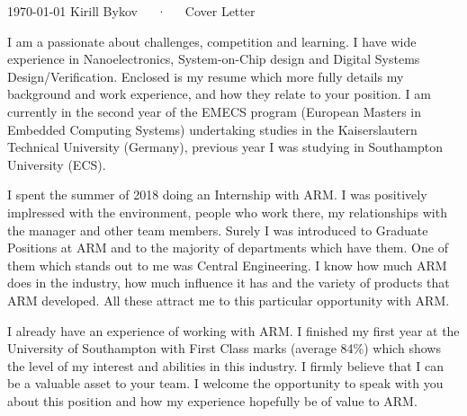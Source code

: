 \documentclass[11pt, a4paper]{awesome-cv}
\begin{document}
\makecvheader[R]

\makecvfooter
  {\today}
  {Kirill Bykov~~~·~~~Cover Letter}
  {}

\makelettertitle

\begin{cvletter}

I am a passionate about challenges, competition and learning. I have wide experience in Nanoelectronics, System-on-Chip design and Digital Systems Design/Verification. Enclosed is my resume which more fully details my background and work experience, and how they relate to your position. I am currently in the second year of the EMECS program (European Masters in Embedded Computing Systems) undertaking studies in the Kaiserslautern Technical University (Germany), previous year I was studying in Southampton University (ECS).

I spent the summer of 2018 doing an Internship with ARM. I was positively implressed with the environment, people who work there, my relationships with the manager and other team members. Surely I was introduced to Graduate Positions at ARM and to the majority of departments which have them. One of them which stands out to me was Central Engineering. I know how much ARM does in the industry, how much influence it has and the variety of products that ARM developed. All these attract me to this particular opportunity with ARM.

I already have an experience of working with ARM. I finished my first year at the University of Southampton with First Class marks (average 84\%) which shows the level of my interest and abilities in this industry. I firmly believe that I can be a valuable asset to your team. I welcome the opportunity to speak with you about this position and how my experience hopefully be of value to ARM.

\end{cvletter}


\makeletterclosing
\end{document}
